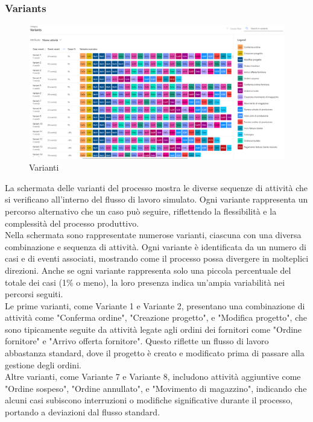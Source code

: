 \documentclass{article}
\begin{document}
\subsubsection{Variants}
\begin{figure}[H]
    \centering
    \includegraphics[width=\textwidth]{imgMicrosoft/SecondaSimulazione/VariantsSimulazione2.png}
    \caption{Varianti}
    \label{fig:variants}
\end{figure}
La schermata delle varianti del processo mostra le diverse sequenze di attività che si verificano all'interno del flusso di lavoro simulato. Ogni variante rappresenta un percorso alternativo che un caso può seguire, riflettendo la flessibilità e la complessità del processo produttivo.\\
Nella schermata sono rappresentate numerose varianti, ciascuna con una diversa combinazione e sequenza di attività. Ogni variante è identificata da un numero di casi e di eventi associati, mostrando come il processo possa divergere in molteplici direzioni. Anche se ogni variante rappresenta solo una piccola percentuale del totale dei casi (1\% o meno), la loro presenza indica un'ampia variabilità nei percorsi seguiti.\\
Le prime varianti, come Variante 1 e Variante 2, presentano una combinazione di attività come "Conferma ordine", "Creazione progetto", e "Modifica progetto", che sono tipicamente seguite da attività legate agli ordini dei fornitori come "Ordine fornitore" e "Arrivo offerta fornitore". Questo riflette un flusso di lavoro abbastanza standard, dove il progetto è creato e modificato prima di passare alla gestione degli ordini.\\
Altre varianti, come Variante 7 e Variante 8, includono attività aggiuntive come "Ordine sospeso", "Ordine annullato", e "Movimento di magazzino", indicando che alcuni casi subiscono interruzioni o modifiche significative durante il processo, portando a deviazioni dal flusso standard.\\
\end{document}
